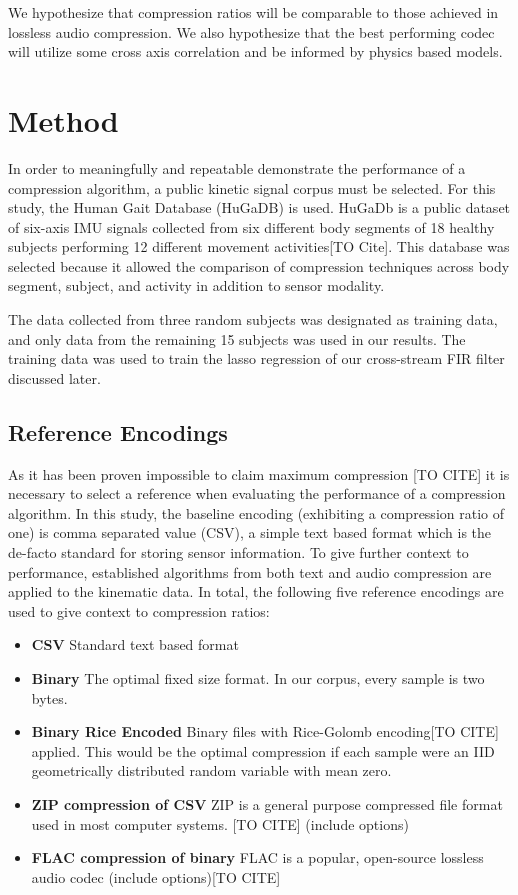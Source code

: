 \documentclass[journal]{IEEEtran}
\begin{document}
We hypothesize that compression ratios will be comparable to those achieved in lossless audio compression. We also hypothesize that the best performing codec will utilize some cross axis correlation and be informed by physics based models.

\section{Method}
In order to meaningfully and repeatable demonstrate the performance of a compression algorithm, a public kinetic signal corpus must be selected. For this study, the Human Gait Database (HuGaDB) is used. HuGaDb is a public dataset of six-axis IMU signals collected from six different body segments of 18 healthy subjects performing 12 different movement activities[TO Cite]. This database was selected because it allowed the comparison of compression techniques across body segment, subject, and activity in addition to sensor modality.

The data collected from three random subjects was designated as training data, and only data from the remaining 15 subjects was used in our results. The training data was used to train the lasso regression of our cross-stream FIR filter discussed later.

\subsection{Reference Encodings}
As it has been proven impossible to claim maximum compression [TO CITE] it is necessary to select a reference when evaluating the performance of a compression algorithm. In this study, the baseline encoding (exhibiting a compression ratio of one) is comma separated value (CSV), a simple text based format which is the de-facto standard for storing sensor information. To give further context to performance, established algorithms from both text and audio compression are applied to the kinematic data. In total, the following five reference encodings are used to give context to compression ratios:

\begin{itemize}
  \item \textbf{CSV} Standard text based format
  \item \textbf{Binary} The optimal fixed size format. In our corpus, every sample is two bytes.
  \item \textbf{Binary Rice Encoded} Binary files with Rice-Golomb encoding[TO CITE] applied. This would be the optimal compression if each sample were an IID geometrically distributed random variable with mean zero.
  \item \textbf{ZIP compression of CSV} ZIP is a general purpose compressed file format used in most computer systems. [TO CITE] (include options)
  \item \textbf{FLAC compression of binary} FLAC is a popular, open-source lossless audio codec (include options)[TO CITE]
\end{itemize}
\end{document}

